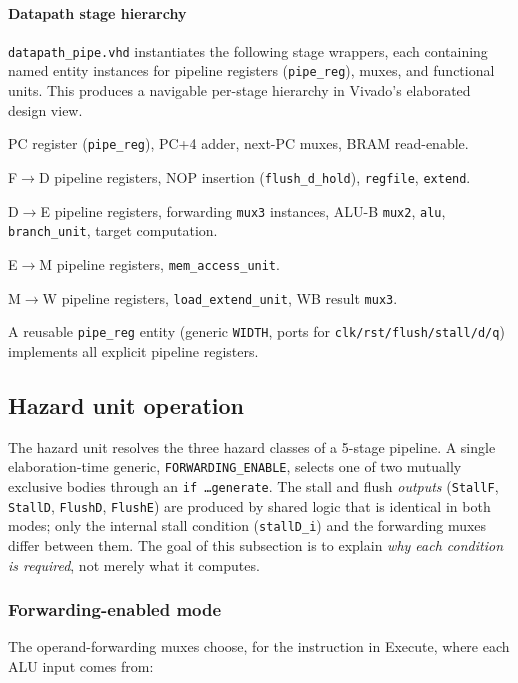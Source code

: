 \paragraph{Datapath stage hierarchy}
\texttt{datapath\_pipe.vhd} instantiates the following stage wrappers, each
containing named entity instances for pipeline registers (\texttt{pipe\_reg}),
muxes, and functional units.  This produces a navigable per-stage hierarchy in
Vivado's elaborated design view.
\begin{description}[leftmargin=*,labelwidth=3.2cm]
  \item[\texttt{fetch\_stage}] PC register (\texttt{pipe\_reg}), PC+4 adder, next-PC muxes, BRAM read-enable.
  \item[\texttt{decode\_stage}] F$\rightarrow$D pipeline registers, NOP insertion (\texttt{flush\_d\_hold}), \texttt{regfile}, \texttt{extend}.
  \item[\texttt{execute\_stage}] D$\rightarrow$E pipeline registers, forwarding \texttt{mux3} instances, ALU-B \texttt{mux2}, \texttt{alu}, \texttt{branch\_unit}, target computation.
  \item[\texttt{memory\_stage}] E$\rightarrow$M pipeline registers, \texttt{mem\_access\_unit}.
  \item[\texttt{writeback\_stage}] M$\rightarrow$W pipeline registers, \texttt{load\_extend\_unit}, WB result \texttt{mux3}.
\end{description}
A reusable \texttt{pipe\_reg} entity (generic \texttt{WIDTH}, ports for
\texttt{clk/rst/flush/stall/d/q}) implements all explicit pipeline registers.

\subsection{Hazard unit operation}
The hazard unit resolves the three hazard classes of a 5-stage pipeline. A
single elaboration-time generic, \texttt{FORWARDING\_ENABLE}, selects one of
two mutually exclusive bodies through an \texttt{if \ldots generate}. The
stall and flush \emph{outputs} (\texttt{StallF}, \texttt{StallD},
\texttt{FlushD}, \texttt{FlushE}) are produced by shared logic that is
identical in both modes; only the internal stall condition
(\texttt{stallD\_i}) and the forwarding muxes differ between them. The goal of
this subsection is to explain \emph{why each condition is required}, not merely
what it computes.

\subsubsection{Forwarding-enabled mode}
The operand-forwarding muxes choose, for the instruction in Execute, where each
ALU input comes from:

